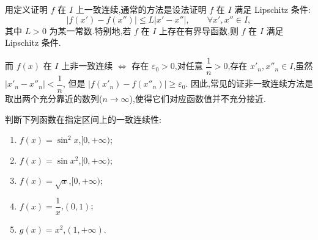用定义证明 $f$ 在 $I$ 上一致连续,通常的方法是设法证明 $f$ 在 $I$ 满足 Lipschitz 条件:
\[
    |f(x')-f(x'')|\leq L|x'-x''|, \qquad \forall x',x''\in I,
\]
其中 $L>0$ 为某一常数.特别地,若 $f$ 在 $I$ 上存在有界导函数,则 $f$ 在 $I$ 满足 Lipschitz 条件.

而 $f(x)$ 在 $I$ 上非一致连续 $\Longleftrightarrow$ 存在 $\varepsilon_0>0$,对任意 $\dfrac{1}{n}>0$,存在 $x'_n,x''_n\in I$,虽然 $|x'_n-x''_n|<\dfrac{1}{n}$,
但是 $|f(x'_n)-f(x''_n)|\geq\varepsilon_0$.
因此,常见的证非一致连续方法是取出两个充分靠近的数列($n\to\infty$),使得它们对应函数值并不充分接近.

\begin{example}
    判断下列函数在指定区间上的一致连续性:
    \begin{enumerate}
        \item $f(x)=\sin^2x$,$\lbrack 0,+\infty)$;
        \item $f(x)=\sin x^2$,$\lbrack 0,+\infty)$;
        \item $f(x)=\sqrt{x}$,$\lbrack 0,+\infty)$;
        \item $f(x)=\dfrac{1}{x}$,$(0,1)$;
        \item $g(x)=x^2$,$(1,+\infty)$.
    \end{enumerate}
\end{example}
\exampleblank

